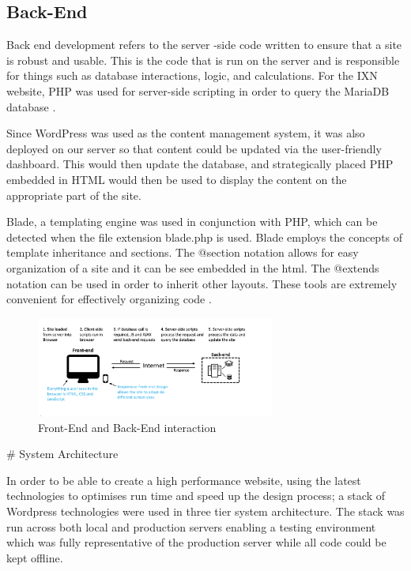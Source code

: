 \documentclass[fontsize=10pt]{extarticle}
\numberwithin{figure}{section} %
\begin{document}
\hypertarget{back-end}{%
\subsection{Back-End}\label{back-end}}

Back end development refers to the server -side code written to ensure
that a site is robust and usable. This is the code that is run on the
server and is responsible for things such as database interactions,
logic, and calculations. For the IXN website, PHP was used for
server-side scripting in order to query the MariaDB database \cite{p17}
.

Since WordPress was used as the content management system, it was also
deployed on our server so that content could be updated via the
user-friendly dashboard. This would then update the database, and
strategically placed PHP embedded in HTML would then be used to display
the content on the appropriate part of the site.

Blade, a templating engine was used in conjunction with PHP, which can
be detected when the file extension blade.php is used. Blade employs the
concepts of template inheritance and sections. The @section notation
allows for easy organization of a site and it can be see embedded in the
html. The @extends notation can be used in order to inherit other
layouts. These tools are extremely convenient for effectively organizing
code \cite{p18} .

\begin{figure}[H]
      \centering
      \includegraphics[trim = 0 0 0 0, clip, width=0.7\textwidth]{ph17.png}
      \caption{Front-End and Back-End interaction}
 \end{figure}

\newpage \# System Architecture

In order to be able to create a high performance website, using the
latest technologies to optimises run time and speed up the design
process; a stack of Wordpress technologies were used in three tier
system architecture. The stack was run across both local and production
servers enabling a testing environment which was fully representative of
the production server while all code could be kept offline.
\end{document}
